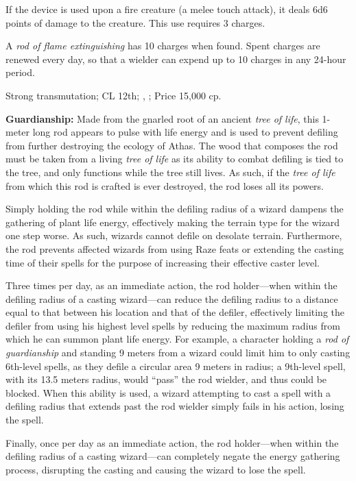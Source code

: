 If the device is used upon a fire creature (a melee touch attack), it deals 6d6 points of damage to the creature. This use requires 3 charges.

A \emph{rod of flame extinguishing} has 10 charges when found. Spent charges are renewed every day, so that a wielder can expend up to 10 charges in any 24-hour period.

Strong transmutation; CL 12th; , ; Price 15,000 cp.

\textbf{Guardianship:} Made from the gnarled root of an ancient \emph{tree of life}, this 1-meter long rod appears to pulse with life energy and is used to prevent defiling from further destroying the ecology of Athas. The wood that composes the rod must be taken from a living \emph{tree of life} as its ability to combat defiling is tied to the tree, and only functions while the tree still lives. As such, if the \emph{tree of life} from which this rod is crafted is ever destroyed, the rod loses all its powers.

Simply holding the rod while within the defiling radius of a wizard dampens the gathering of plant life energy, effectively making the terrain type for the wizard one step worse. As such, wizards cannot defile on desolate terrain. Furthermore, the rod prevents affected wizards from using Raze feats or extending the casting time of their spells for the purpose of increasing their effective caster level.

Three times per day, as an immediate action, the rod holder---when within the defiling radius of a casting wizard---can reduce the defiling radius to a distance equal to that between his location and that of the defiler, effectively limiting the defiler from using his highest level spells by reducing the maximum radius from which he can summon plant life energy. For example, a character holding a \emph{rod of guardianship} and standing 9 meters from a wizard could limit him to only casting 6th-level spells, as they defile a circular area 9 meters in radius; a 9th-level spell, with its 13.5 meters radius, would ``pass'' the rod wielder, and thus could be blocked. When this ability is used, a wizard attempting to cast a spell with a defiling radius that extends past the rod wielder simply fails in his action, losing the spell.

Finally, once per day as an immediate action, the rod holder---when within the defiling radius of a casting wizard---can completely negate the energy gathering process, disrupting the casting and causing the wizard to lose the spell.

